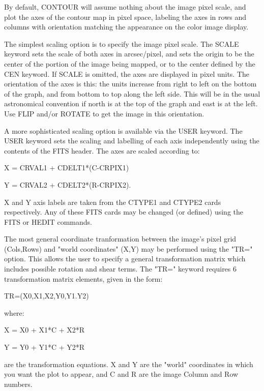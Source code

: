  
By default, CONTOUR will assume nothing about the image pixel scale, and
plot the axes of the contour map in pixel space, labeling the axes in rows
and columns with orientation matching the appearance on the color image
display.
 
The simplest scaling option is to specify the image pixel scale.  The SCALE
keyword sets the scale of both axes in arcsec/pixel, and sets the origin to
be the center of the portion of the image being mapped, or to the center
defined by the CEN keyword.  If SCALE is omitted, the axes are displayed in
pixel units.  The orientation of the axes is this: the units increase from
right to left on the bottom of the graph, and from bottom to top along the
left side.  This will be in the usual astronomical convention if north is
at the top of the graph and east is at the left.  Use FLIP and/or ROTATE to
get the image in this orientation.
 
A more sophisticated scaling option is available via the USER keyword. The
USER keyword sets the scaling and labelling of each axis independently
using the contents of the FITS header.  The axes are scaled according to:
\begin{hanging} 
  \item{X = CRVAL1 + CDELT1*(C-CRPIX1)}
  \item{Y = CRVAL2 + CDELT2*(R-CRPIX2).}
\end{hanging} 
X and Y axis labels are taken from the CTYPE1 and CTYPE2 cards
respectively.  Any of these FITS cards may be changed (or defined) using
the FITS or HEDIT commands.
 
The most general coordinate tranformation between the image's pixel grid
(Cols,Rows) and "world coordinates" (X,Y) may be performed using the "TR="
option.  This allows the user to specify a general transformation matrix
which includes possible rotation and shear terms.  The "TR=" keyword
requires 6 transformation matrix elements, given in the form:
\begin{hanging} 
  \item{TR=(X0,X1,X2,Y0,Y1.Y2)}
\end{hanging}
where:
\begin{hanging} 
  \item{X = X0 + X1*C + X2*R}
  \item{Y = Y0 + Y1*C + Y2*R}
\end{hanging}
are the transformation equations.  X and Y are the "world" coordinates in
which you want the plot to appear, and C and R are the image Column and Row
numbers.
 
